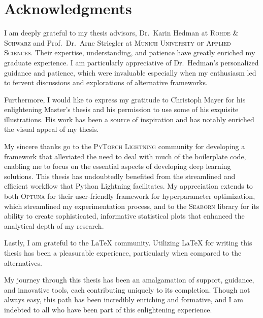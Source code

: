 \chapter*{Acknowledgments}
\markright{}

I am deeply grateful to my thesis advisors, Dr.\ Karin Hedman at \textsc{Rohde \& Schwarz} and Prof.\ Dr.\ Arne Striegler
at \textsc{Munich University of Applied Sciences}. Their expertise, understanding, and patience have greatly enriched my
graduate experience. I am particularly appreciative of Dr.\ Hedman's personalized guidance and patience, which were
invaluable especially when my enthusiasm led to fervent discussions and explorations of alternative frameworks.

Furthermore, I would like to express my gratitude to Christoph Mayer for his enlightening Master's thesis and his
permission to use some of his exquisite illustrations. His work has been a source of inspiration and has notably
enriched the visual appeal of my thesis.

My sincere thanks go to the \textsc{PyTorch Lightning} community for developing a framework that alleviated the need to
deal with much of the boilerplate code, enabling me to focus on the essential aspects of developing deep learning
solutions. This thesis has undoubtedly benefited from the streamlined and efficient workflow that Python Lightning
facilitates.
My appreciation extends to both \textsc{Optuna} for their user-friendly framework for hyperparameter optimization,
which streamlined my experimentation process, and to the \textsc{Seaborn} library for its ability to create
sophisticated, informative statistical plots that enhanced the analytical depth of my research.

Lastly, I am grateful to the \LaTeX{} community. Utilizing \LaTeX{} for writing this thesis has been a pleasurable
experience, particularly when compared to the alternatives.

My journey through this thesis has been an amalgamation of support, guidance, and innovative tools, each contributing
uniquely to its completion. Though not always easy, this path has been incredibly enriching and formative, and I am
indebted to all who have been part of this enlightening experience.
